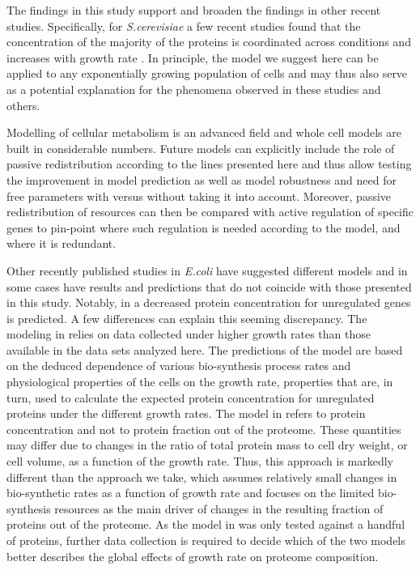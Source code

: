 \documentclass{article}
\begin{document}
The findings in this study support and broaden the findings in other recent studies.
Specifically, for \emph{S.cerevisiae} a few recent studies found that the concentration of the majority of the proteins is coordinated across conditions and increases with growth rate \cite{Keren2013,Gasch2000,Brauer2008a}.
In principle, the model we suggest here can be applied to any exponentially growing population of cells and may thus also serve as a potential explanation for the phenomena observed in these studies and others.

Modelling of cellular metabolism is an advanced field and whole cell models are built in considerable numbers.
Future models can explicitly include the role of passive redistribution according to the lines presented here and thus allow testing the improvement in model prediction as well as model robustness and need for free parameters with versus without taking it into account.
Moreover, passive redistribution of resources can then be compared with active regulation of specific genes to pin-point where such regulation is needed according to the model, and where it is redundant.

Other recently published studies in \emph{E.coli} have suggested different models and in some cases have results  and predictions that do not coincide with those presented in this study.
Notably, in \cite{Klumpp2009,Klumpp2014} a decreased protein concentration for unregulated genes is predicted.
A few differences can explain this seeming discrepancy.
The modeling in \cite{Klumpp2009} relies on data collected under higher growth rates than those available in the data sets analyzed here.
The predictions of the model are based on the deduced dependence of various bio-synthesis process rates and physiological properties of the cells on the growth rate, properties that are, in turn, used to calculate the expected protein concentration for unregulated proteins under the different growth rates.
The model in \cite{Klumpp2009} refers to protein concentration and not to protein fraction out of the proteome. These quantities may differ due to changes in the ratio of total protein mass to cell dry weight, or cell volume, as a function of the growth rate.
Thus, this approach is markedly different than the approach we take, which assumes relatively small changes in bio-synthetic rates as a function of growth rate and focuses on the limited bio-synthesis resources as the main driver of changes in the resulting fraction of proteins out of the proteome.
As the model in \cite{Klumpp2009} was only tested against a handful of proteins, further data collection is required to decide which of the two models better describes the global effects of growth rate on proteome composition.
\end{document}
